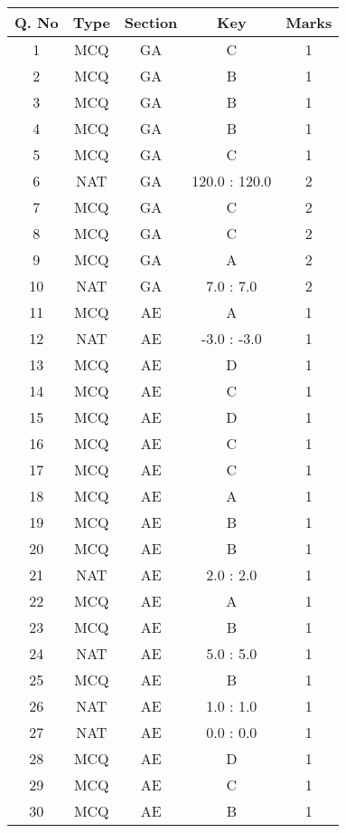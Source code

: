 \begin{tabular}[12pt]{ |c|c|c|c|c| }
    \hline
    {Q. No} & {Type} & {Section} & {Key} & {Marks} \\
    \hline
    1  & MCQ & GA & C & 1 \\
    \hline
    2  & MCQ & GA & B & 1 \\
    \hline
    3  & MCQ & GA & B & 1 \\
    \hline
    4  & MCQ & GA & B & 1 \\
    \hline
    5  & MCQ & GA & C & 1 \\
    \hline
    6  & NAT & GA & 120.0 : 120.0 & 2 \\
    \hline
    7  & MCQ & GA & C & 2 \\
    \hline
    8  & MCQ & GA & C & 2 \\
    \hline
    9  & MCQ & GA & A & 2 \\
    \hline
    10 & NAT & GA & 7.0 : 7.0 & 2 \\
    \hline
    11 & MCQ & AE & A & 1 \\
    \hline
    12 & NAT & AE & -3.0 : -3.0 & 1 \\
    \hline
    13 & MCQ & AE & D & 1 \\
    \hline
    14 & MCQ & AE & C & 1 \\
    \hline
    15 & MCQ & AE & D & 1 \\
    \hline
    16 & MCQ & AE & C & 1 \\
    \hline
    17 & MCQ & AE & C & 1 \\
    \hline
    18 & MCQ & AE & A & 1 \\
    \hline
    19 & MCQ & AE & B & 1 \\
    \hline
    20 & MCQ & AE & B & 1 \\
    \hline
    21 & NAT & AE & 2.0 : 2.0 & 1 \\
    \hline
    22 & MCQ & AE & A & 1 \\
    \hline
    23 & MCQ & AE & B & 1 \\
    \hline
    24 & NAT & AE & 5.0 : 5.0 & 1 \\
    \hline
    25 & MCQ & AE & B & 1 \\
    \hline
    26 & NAT & AE & 1.0 : 1.0 & 1 \\
    \hline
    27 & NAT & AE & 0.0 : 0.0 & 1 \\
    \hline
    28 & MCQ & AE & D & 1 \\
    \hline
    29 & MCQ & AE & C & 1 \\
    \hline
    30 & MCQ & AE & B & 1 \\

\end{tabular}
